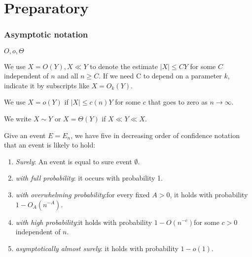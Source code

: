 \part{Preparatory}	
\section{Asymptotic notation}

\begin{definition} $O, o, \Theta$

    We use $X=O(Y),X\ll Y$ to denote the estimate $|X|\leq CY$ for some $C$ independent of $n$ and all $n\geq C$. 
If we need C to depend on a parameter $k$, indicate it by subscripts like $X=O_k(Y)$. 

We use $X=o(Y)$ if $|X|\leq c(n)Y$ for some $c$ that goes to zero as $n \to \infty$. 

We write $X\sim Y$ or $X=\Theta(Y)$ if $X\ll Y \ll X$.

\end{definition}

\begin{definition} Give an event $E=E_n$, we have five in decreasing order of confidence notation that an event is likely to hold:
    \begin{enumerate}
        \item  \textit{Surely}: 
        An event is equal to sure event $\emptyset$.
        \item \textit{with full probability}:  it occurs with probability 1.
        \item \textit{with overwhelming probability}:for every fixed $A>0$, it holds with probability $1-O_A(n^{-A})$.
        \item \textit{with high probability}:it holds with probability $1-O(n^{-c})$for some $c>0$ independent of $n$.
        \item \textit{asymptotically almost surely}: it holds with probability $1-o(1)$. 
    \end{enumerate}
\end{definition}

